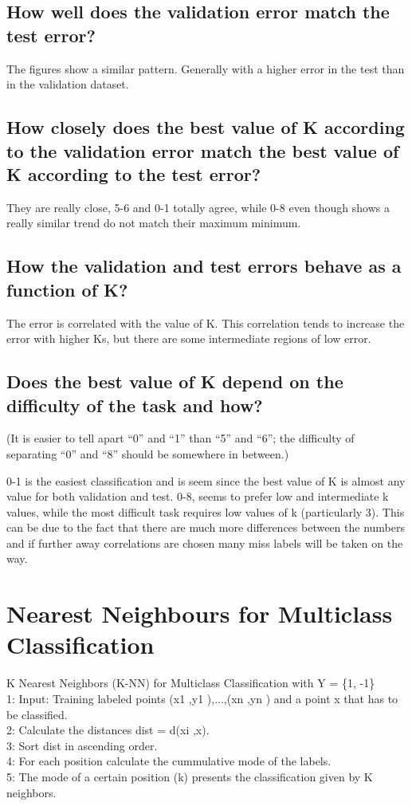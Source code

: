 \documentclass[a4paper]{article}
\begin{document}
\subsection{How well does the validation error match the test error?}

The figures show a similar pattern. Generally with a higher error in the test than in the validation dataset.\\

\subsection{How closely does the best value of K according to the validation error
match the best value of K according to the test error?}
They are really close, 5-6 and 0-1 totally agree, while 0-8 even though shows a really similar trend do not match their maximum minimum.

\subsection{How the validation and test errors behave as a function of K?} 
The error is correlated with the value of K. This correlation tends to increase the error with higher Ks, but there are some intermediate regions of low error.


\subsection{Does the best value of K depend on the difficulty of the task and how?}
(It is easier to tell apart “0” and “1” than “5” and “6”; the difficulty
of separating “0” and “8” should be somewhere in between.)

0-1 is the easiest classification and is seem since the best value of K is almost any value for both validation and test. 0-8, seems to prefer low and intermediate k values, while the most difficult task requires low values of k (particularly 3). This can be due to the fact that there are much more differences between the numbers and if further away correlations are chosen many miss labels will be taken on the way.


\section{Nearest Neighbours for Multiclass Classification}
 K Nearest Neighbors (K-NN) for Multiclass Classification with Y = \{1, -1\} \\
1: Input: Training labeled points {(x1 ,y1 ),...,(xn ,yn )} and a point x that has to be classified. \\
2: Calculate the distances dist = d(xi ,x). \\
3: Sort dist in ascending order. \\
4: For each position calculate the cummulative mode of the labels. \\
5: The mode of a certain position (k) presents the classification given by K neighbors.
\end{document}
